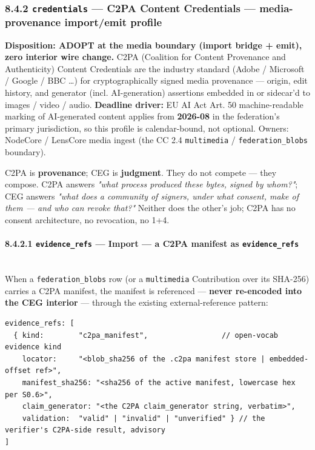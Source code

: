 \documentclass[11pt]{article}
\begin{document}
\subsubsection*{8.4.2 \texttt{credentials} — C2PA Content Credentials — media-provenance import/emit profile}


\textbf{Disposition: ADOPT at the media boundary (import bridge + emit), zero interior wire change.} C2PA (Coalition for Content Provenance and Authenticity) Content Credentials are the industry standard (Adobe / Microsoft / Google / BBC …) for cryptographically signed media provenance — origin, edit history, and generator (incl. AI-generation) assertions embedded in or sidecar'd to images / video / audio. \textbf{Deadline driver:} EU AI Act Art. 50 machine-readable marking of AI-generated content applies from \textbf{2026-08} in the federation's primary jurisdiction, so this profile is calendar-bound, not optional. Owners: NodeCore / LensCore media ingest (the CC 2.4 \texttt{multimedia} / \texttt{federation\_blobs} boundary).


C2PA is \textbf{provenance}; CEG is \textbf{judgment}. They do not compete — they compose. C2PA answers \textit{"what process produced these bytes, signed by whom?"}; CEG answers \textit{"what does a community of signers, under what consent, make of them — and who can revoke that?"} Neither does the other's job; C2PA has no consent architecture, no revocation, no 1+4.


\paragraph{8.4.2.1 \texttt{evidence\_refs} — Import — a C2PA manifest as \texttt{evidence\_refs}}\mbox{}\\


When a \texttt{federation\_blobs} row (or a \texttt{multimedia} Contribution over its SHA-256) carries a C2PA manifest, the manifest is referenced — \textbf{never re-encoded into the CEG interior} — through the existing external-reference pattern:


\begin{lstlisting}
evidence_refs: [
  { kind:        "c2pa_manifest",                 // open-vocab evidence kind
    locator:     "<blob_sha256 of the .c2pa manifest store | embedded-offset ref>",
    manifest_sha256: "<sha256 of the active manifest, lowercase hex per S0.6>",
    claim_generator: "<the C2PA claim_generator string, verbatim>",
    validation:  "valid" | "invalid" | "unverified" } // the verifier's C2PA-side result, advisory
]
\end{lstlisting}
\end{document}
